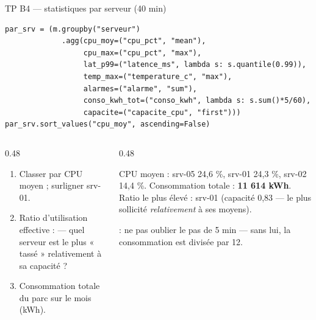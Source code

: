 \begin{frame}[fragile]{TP B4 --- statistiques par serveur (40 min)}
\begin{codebox}
\begin{lstlisting}
par_srv = (m.groupby("serveur")
             .agg(cpu_moy=("cpu_pct", "mean"),
                  cpu_max=("cpu_pct", "max"),
                  lat_p99=("latence_ms", lambda s: s.quantile(0.99)),
                  temp_max=("temperature_c", "max"),
                  alarmes=("alarme", "sum"),
                  conso_kwh_tot=("conso_kwh", lambda s: s.sum()*5/60),
                  capacite=("capacite_cpu", "first")))
par_srv.sort_values("cpu_moy", ascending=False)
\end{lstlisting}
\end{codebox}
\begin{columns}[t]
\begin{column}{0.48\textwidth}
\begin{abox}[Exercices]
\begin{enumerate}
\item Classer par CPU moyen ; surligner srv-01.
\item Ratio d'utilisation effective :
 --- quel serveur est le plus
« tassé » relativement à sa capacité ?
\item Consommation totale du parc sur le mois (kWh).
\end{enumerate}
\end{abox}
\end{column}
\begin{column}{0.48\textwidth}
\begin{ebox}
CPU moyen : srv-05 24,6 \%, srv-01 24,3 \%, srv-02 14,4 \%.
Consommation totale : \textbf{11 614 kWh}.
Ratio le plus élevé : srv-01 (capacité 0,83 ---
le plus sollicité \emph{relativement} à ses moyens).
\end{ebox}
\begin{wbox}
 : ne pas oublier le pas de 5 min ---
sans lui, la consommation est divisée par 12.
\end{wbox}
\end{column}
\end{columns}
\end{frame}

